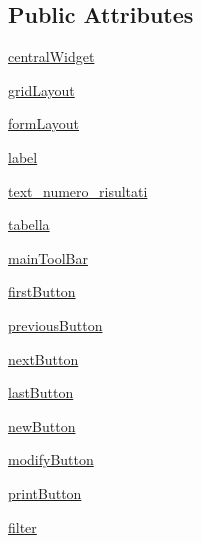 \subsection*{Public Attributes}
\begin{DoxyCompactItemize}
\item 
\hyperlink{classmmasgis_1_1Ui__risultati_1_1Ui__MainWindowResults_a0a86047d6e47d3974d98e76e9a6c4a89}{centralWidget}
\item 
\hyperlink{classmmasgis_1_1Ui__risultati_1_1Ui__MainWindowResults_a30fa7af787312a27aa151429014fc6c0}{gridLayout}
\item 
\hyperlink{classmmasgis_1_1Ui__risultati_1_1Ui__MainWindowResults_ade53ff4d6609d59d9c060f6c8aa50994}{formLayout}
\item 
\hyperlink{classmmasgis_1_1Ui__risultati_1_1Ui__MainWindowResults_a5061c4d58f7d7aea5766b3eee94f2d48}{label}
\item 
\hyperlink{classmmasgis_1_1Ui__risultati_1_1Ui__MainWindowResults_aefb531486c01aa0f1fa4b7dac0393b25}{text\_\-numero\_\-risultati}
\item 
\hyperlink{classmmasgis_1_1Ui__risultati_1_1Ui__MainWindowResults_a0238f6f16ceb0843a7cde349f6abed61}{tabella}
\item 
\hyperlink{classmmasgis_1_1Ui__risultati_1_1Ui__MainWindowResults_a2ab93bcc5427c21ac2f47428e5a2659e}{mainToolBar}
\item 
\hyperlink{classmmasgis_1_1Ui__risultati_1_1Ui__MainWindowResults_ad3e387aa7f1256075031c611413c26b7}{firstButton}
\item 
\hyperlink{classmmasgis_1_1Ui__risultati_1_1Ui__MainWindowResults_aadeab8925028fd3e2c43fbd10dc0091a}{previousButton}
\item 
\hyperlink{classmmasgis_1_1Ui__risultati_1_1Ui__MainWindowResults_ad8a809235e68e462316442aea63b7bb2}{nextButton}
\item 
\hyperlink{classmmasgis_1_1Ui__risultati_1_1Ui__MainWindowResults_a6ce4b128736831a41ee7192ca9e26ba7}{lastButton}
\item 
\hyperlink{classmmasgis_1_1Ui__risultati_1_1Ui__MainWindowResults_a78a80263b66c93aaa7b04c1e75d8dc47}{newButton}
\item 
\hyperlink{classmmasgis_1_1Ui__risultati_1_1Ui__MainWindowResults_a7a0beb19c471e7841e8bb3892c4dae75}{modifyButton}
\item 
\hyperlink{classmmasgis_1_1Ui__risultati_1_1Ui__MainWindowResults_a60c421a62e09eb294fb2fde46d2cb733}{printButton}
\item 
\hyperlink{classmmasgis_1_1Ui__risultati_1_1Ui__MainWindowResults_a42c9ee1ff547ac1a7e0db9a6559ef6b8}{filter}

\end{DoxyCompactItemize}

